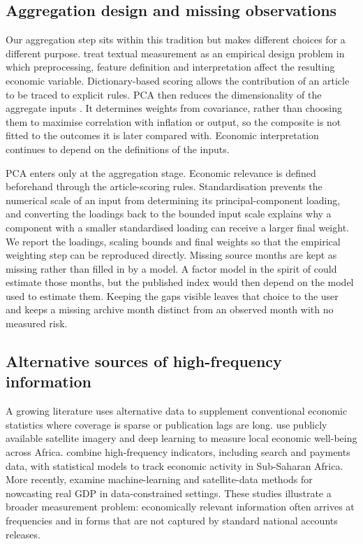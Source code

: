 \documentclass[11pt]{article}
\begin{document}
\subsection{Aggregation design and missing observations}
Our aggregation step sits within this tradition but makes different choices for a different purpose. \citet{gentzkow2019} treat textual measurement as an empirical design problem in which preprocessing, feature definition and interpretation affect the resulting economic variable. Dictionary-based scoring allows the contribution of an article to be traced to explicit rules. PCA then reduces the dimensionality of the aggregate inputs \citep{jolliffe2016}. It determines weights from covariance, rather than choosing them to maximise correlation with inflation or output, so the composite is not fitted to the outcomes it is later compared with. Economic interpretation continues to depend on the definitions of the inputs.

PCA enters only at the aggregation stage. Economic relevance is defined beforehand through the article-scoring rules. Standardisation prevents the numerical scale of an input from determining its principal-component loading, and converting the loadings back to the bounded input scale explains why a component with a smaller standardised loading can receive a larger final weight. We report the loadings, scaling bounds and final weights so that the empirical weighting step can be reproduced directly. Missing source months are kept as missing rather than filled in by a model. A factor model in the spirit of \citet{banbura2014} could estimate those months, but the published index would then depend on the model used to estimate them. Keeping the gaps visible leaves that choice to the user and keeps a missing archive month distinct from an observed month with no measured risk.

\subsection{Alternative sources of high-frequency information}
A growing literature uses alternative data to supplement conventional economic statistics where coverage is sparse or publication lags are long. \citet{yeh2020} use publicly available satellite imagery and deep learning to measure local economic well-being across Africa. \citet{buell2021} combine high-frequency indicators, including search and payments data, with statistical models to track economic activity in Sub-Saharan Africa. More recently, \citet{fotopoulou2026} examine machine-learning and satellite-data methods for nowcasting real GDP in data-constrained settings. These studies illustrate a broader measurement problem: economically relevant information often arrives at frequencies and in forms that are not captured by standard national accounts releases.
\end{document}
